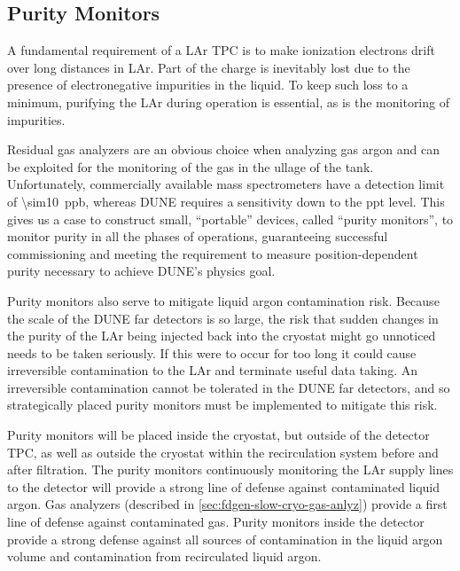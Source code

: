 \subsection{Purity Monitors} 
\label{sec:fdgen-slow-cryo-purity-mon}
\label{sec:fdsp-slow-cryo-purity-mon} %
\label{sec:fddp-slow-cryo-purity-mon} %
A fundamental requirement of a LAr TPC is to make ionization electrons drift over long distances in LAr. Part of the charge is inevitably lost due to the presence of electronegative impurities in the liquid. To keep such loss to a minimum, purifying the LAr during operation is essential, as is the monitoring of impurities.

Residual gas analyzers are an obvious choice when analyzing gas argon and can be exploited for the monitoring of the gas in the ullage of the tank. Unfortunately, commercially available mass spectrometers have a detection limit of \SI{\sim10}{ppb}, whereas DUNE requires a sensitivity down to the \si{ppt} level. This gives us a case to construct small, ``portable'' devices, called ``purity monitors'', to monitor purity in all the phases of operations, guaranteeing successful commissioning and meeting the requirement to measure position-dependent purity necessary to achieve DUNE's physics goal. 

Purity monitors also serve to mitigate liquid argon contamination risk.  Because the scale of the DUNE far detectors is so large, the risk that sudden changes in the purity of the LAr being injected back into the cryostat might go unnoticed needs to be taken seriously.  If this were to occur for too long it could cause irreversible contamination to the LAr and terminate useful data taking.  An irreversible contamination cannot be tolerated in the DUNE far detectors, and so strategically placed purity monitors must be implemented to mitigate this risk. 

Purity monitors will be placed inside the cryostat, but outside of the detector TPC, as well as outside the cryostat within the recirculation system before and after filtration. The purity monitors continuously monitoring the LAr supply lines to the detector will provide a strong line of defense against contaminated liquid argon. Gas analyzers (described in \ref{sec:fdgen-slow-cryo-gas-anlyz}) provide a first line of defense against contaminated gas.  Purity monitors inside the detector provide a strong defense against all sources of contamination in the liquid argon volume and contamination from recirculated liquid argon.

